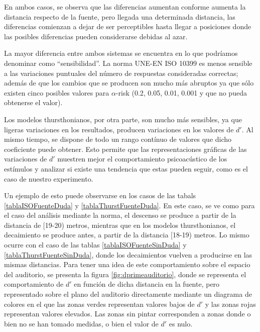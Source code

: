 \documentclass[11pt,a4paper,twoside]{book}
\begin{document}
            En ambos casos, se observa que las diferencias aumentan conforme aumenta la distancia respecto de la fuente, pero llegada una determinada distancia, las diferencias comienzan a dejar de ser perceptibles hasta llegar a posiciones donde las posibles diferencias pueden considerarse debidas al azar.
            
            La mayor diferencia entre ambos sistemas se encuentra en lo que podríamos denominar como ``sensibilidad''. La norma UNE-EN ISO 10399 es menos sensible a las variaciones puntuales del número de respuestas consideradas correctas; además de que los cambios que se producen son mucho más abruptos ya que sólo existen cinco posibles valores para $\alpha$-risk (0.2, 0.05, 0.01, 0.001 y que no pueda obtenerse el valor).
            
            Los modelos thursthonianos, por otra parte, son mucho más sensibles, ya que ligeras variaciones en los resultados, producen variaciones en los valores de $d'$. Al mismo tiempo, se dispone de todo un rango contínuo de valores que dicho coeficiente puede obtener. Esto permite que las representaciones gráficas de las variaciones de $d'$ muestren mejor el comportamiento psicoacústico de los estímulos y analizar si existe una tendencia que estas pueden seguir, como es el caso de nuestro experimento.
            
            Un ejemplo de esto puede observarse en los casos de las tabals \ref{tablaISOFuenteDuda} y \ref{tablaThurstFuenteDuda}. En este caso, se ve como para el caso del análisis mediante la norma, el descenso se produce a partir de la distancia de [19-20) metros, mientras que en los modelos thursthonianos, el decaimiento se produce antes, a partir de la distancia [18-19) metros. Lo mismo ocurre con el caso de las tablas \ref{tablaISOFuenteSinDuda} y \ref{tablaThurstFuenteSinDuda}, donde los decaimientos vuelven a producirse en las mismas distancias. Para tener una idea de este comportamiento sobre el espacio del auditorio, se presenta la figura \ref{fig:dprimeauditorio}, donde se representa el comportamiento de $d'$ en función de dicha distancia en la fuente, pero representado sobre el plano del auditorio directamente mediante un diagrama de colores en el que las zonas verdes representan valores bajos de $d'$ y las zonas rojas representan valores elevados. Las zonas sin pintar corresponden a zonas donde o bien no se han tomado medidas, o bien el valor de $d'$ es nulo.
            
\end{document}
